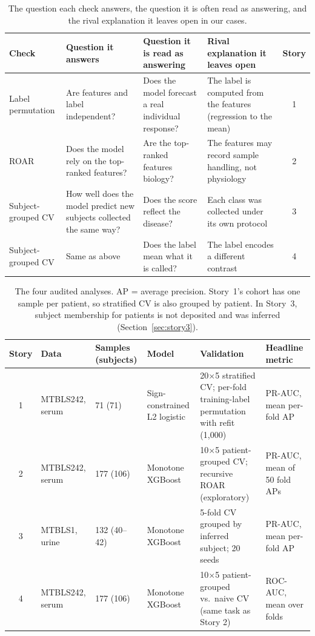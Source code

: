 \documentclass[conference]{IEEEtran}
\begin{document}
\begin{table}[t]
\centering
\caption{The question each check answers, the question it is often read as
answering, and the rival explanation it leaves open in our cases.}
\label{tab:gap}
\footnotesize
\begin{tabular}{@{}p{2.5cm} p{3.5cm} p{3.5cm} p{4.4cm} c@{}}
\toprule
Check & Question it answers & Question it is read as answering & Rival explanation it leaves open & Story \\
\midrule
Label permutation & Are features and label independent? & Does the model forecast a real individual response? & The label is computed from the features (regression to the mean) & 1 \\
ROAR & Does the model rely on the top-ranked features? & Are the top-ranked features biology? & The features may record sample handling, not physiology & 2 \\
Subject-grouped CV & How well does the model predict new subjects collected the same way? & Does the score reflect the disease? & Each class was collected under its own protocol & 3 \\
Subject-grouped CV & Same as above & Does the label mean what it is called? & The label encodes a different contrast & 4 \\
\bottomrule
\end{tabular}
\end{table}

\begin{table}[t]
\centering
\caption{The four audited analyses. AP = average precision. Story~1's
cohort has one sample per patient, so stratified CV is also grouped by
patient. In Story~3, subject membership for patients is not deposited and
was inferred (Section~\ref{sec:story3}).}
\label{tab:setup}
\footnotesize
\begin{tabular}{@{}c p{2.0cm} p{1.6cm} p{2.6cm} p{5.6cm} p{2.9cm}@{}}
\toprule
Story & Data & Samples (subjects) & Model & Validation & Headline metric \\
\midrule
1 & MTBLS242, serum & 71 (71) & Sign-constrained L2 logistic & 20$\times$5 stratified CV; per-fold training-label permutation with refit (1{,}000) & PR-AUC, mean per-fold AP \\
2 & MTBLS242, serum & 177 (106) & Monotone XGBoost & 10$\times$5 patient-grouped CV; recursive ROAR (exploratory) & PR-AUC, mean of 50 fold APs \\
3 & MTBLS1, urine & 132 (40--42) & Monotone XGBoost & 5-fold CV grouped by inferred subject; 20 seeds & PR-AUC, mean per-fold AP \\
4 & MTBLS242, serum & 177 (106) & Monotone XGBoost & 10$\times$5 patient-grouped vs.\ naive CV (same task as Story 2) & ROC-AUC, mean over folds \\
\bottomrule
\end{tabular}
\end{table}
\end{document}
